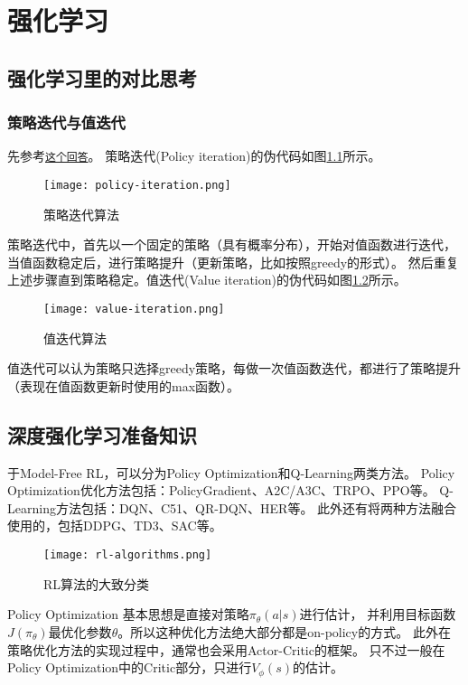 \chapter{强化学习}
\section{强化学习里的对比思考}
\subsection{策略迭代与值迭代}
先参考\href{https://zhuanlan.zhihu.com/p/55217561}{\texttt{这个回答}}。
策略迭代(Policy iteration)的伪代码如图\ref{fig: policy-iteration}所示。
\begin{figure}[htbp]
	\figskip 
	\centering
	\texttt{[image: policy-iteration.png]}	  
	\caption{\label{fig: policy-iteration} 策略迭代算法}
\end{figure}
策略迭代中，首先以一个固定的策略（具有概率分布），开始对值函数进行迭代，当值函数稳定后，进行策略提升（更新策略，比如按照greedy的形式）。
然后重复上述步骤直到策略稳定。值迭代(Value iteration)的伪代码如图\ref{fig: value-iteration}所示。
\begin{figure}[htbp]
	\figskip 
	\centering
	\texttt{[image: value-iteration.png]}	  
	\caption{\label{fig: value-iteration} 值迭代算法}
\end{figure}
值迭代可以认为策略只选择greedy策略，每做一次值函数迭代，都进行了策略提升（表现在值函数更新时使用的max函数）。


\section{深度强化学习准备知识}
于Model-Free RL，可以分为Policy Optimization和Q-Learning两类方法。
Policy Optimization优化方法包括：PolicyGradient、A2C/A3C、TRPO、PPO等。
Q-Learning方法包括：DQN、C51、QR-DQN、HER等。
此外还有将两种方法融合使用的，包括DDPG、TD3、SAC等。

\begin{figure}[htbp]
	\figskip 
	\centering
	\texttt{[image: rl-algorithms.png]}	  
	\caption{\label{fig: rl} RL算法的大致分类}
\end{figure}

Policy Optimization 基本思想是直接对策略$\pi_\theta(a|s)$进行估计，
并利用目标函数$J(\pi_\theta)$最优化参数$\theta$。所以这种优化方法绝大部分都是on-policy的方式。
此外在策略优化方法的实现过程中，通常也会采用Actor-Critic的框架。
只不过一般在Policy Optimization中的Critic部分，只进行$V_\phi(s)$的估计。

